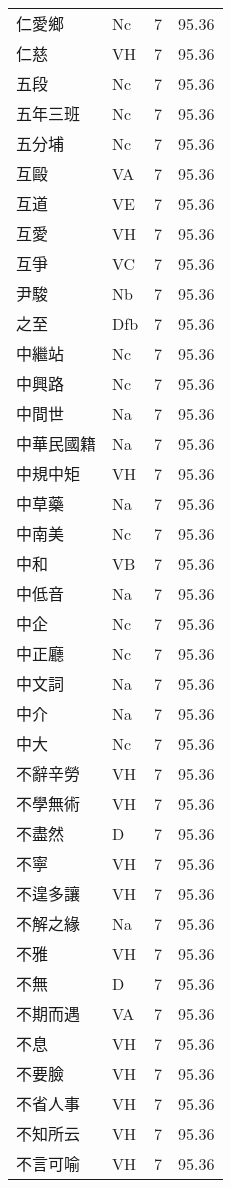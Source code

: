 \documentclass[twocolumn]{book}
\begin{document}
\begin{supertabular}{llrr}
仁愛鄉 & Nc & 7 &  95.36\\
仁慈 & VH & 7 &  95.36\\
五段 & Nc & 7 &  95.36\\
五年三班 & Nc & 7 &  95.36\\
五分埔 & Nc & 7 &  95.36\\
互毆 & VA & 7 &  95.36\\
互道 & VE & 7 &  95.36\\
互愛 & VH & 7 &  95.36\\
互爭 & VC & 7 &  95.36\\
尹駿 & Nb & 7 &  95.36\\
之至 & Dfb & 7 &  95.36\\
中繼站 & Nc & 7 &  95.36\\
中興路 & Nc & 7 &  95.36\\
中間世 & Na & 7 &  95.36\\
中華民國籍 & Na & 7 &  95.36\\
中規中矩 & VH & 7 &  95.36\\
中草藥 & Na & 7 &  95.36\\
中南美 & Nc & 7 &  95.36\\
中和 & VB & 7 &  95.36\\
中低音 & Na & 7 &  95.36\\
中企 & Nc & 7 &  95.36\\
中正廳 & Nc & 7 &  95.36\\
中文詞 & Na & 7 &  95.36\\
中介 & Na & 7 &  95.36\\
中大 & Nc & 7 &  95.36\\
不辭辛勞 & VH & 7 &  95.36\\
不學無術 & VH & 7 &  95.36\\
不盡然 & D & 7 &  95.36\\
不寧 & VH & 7 &  95.36\\
不遑多讓 & VH & 7 &  95.36\\
不解之緣 & Na & 7 &  95.36\\
不雅 & VH & 7 &  95.36\\
不無 & D & 7 &  95.36\\
不期而遇 & VA & 7 &  95.36\\
不息 & VH & 7 &  95.36\\
不要臉 & VH & 7 &  95.36\\
不省人事 & VH & 7 &  95.36\\
不知所云 & VH & 7 &  95.36\\
不言可喻 & VH & 7 &  95.36\\

\end{supertabular}
\end{document}
